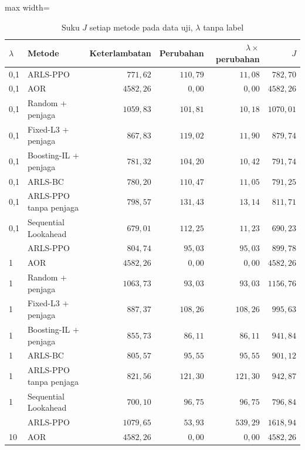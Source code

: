\begin{table}[htbp]
\caption{Suku $J$ setiap metode pada data uji, $\lambda$ tanpa label}
\label{tab:uji-uraian-tanpa-label}
\centering\footnotesize
\setlength{\tabcolsep}{4pt}
\begin{adjustbox}{max width=\textwidth}
\begin{tabular}{llrrrr}
\toprule
$\lambda$ & Metode & Keterlambatan & Perubahan & $\lambda\times$perubahan & $J$ \\
\midrule
0{,}1 & ARLS-PPO & $771{,}62$ & $110{,}79$ & $11{,}08$ & $782{,}70$ \\
0{,}1 & AOR & $4582{,}26$ & $0{,}00$ & $0{,}00$ & $4582{,}26$ \\
0{,}1 & Random + penjaga & $1059{,}83$ & $101{,}81$ & $10{,}18$ & $1070{,}01$ \\
0{,}1 & Fixed-L3 + penjaga & $867{,}83$ & $119{,}02$ & $11{,}90$ & $879{,}74$ \\
0{,}1 & Boosting-IL + penjaga & $781{,}32$ & $104{,}20$ & $10{,}42$ & $791{,}74$ \\
0{,}1 & ARLS-BC & $780{,}20$ & $110{,}47$ & $11{,}05$ & $791{,}25$ \\
0{,}1 & ARLS-PPO tanpa penjaga & $798{,}57$ & $131{,}43$ & $13{,}14$ & $811{,}71$ \\
0{,}1 & Sequential Lookahead & $679{,}01$ & $112{,}25$ & $11{,}23$ & $690{,}23$ \\
\addlinespace
1 & ARLS-PPO & $804{,}74$ & $95{,}03$ & $95{,}03$ & $899{,}78$ \\
1 & AOR & $4582{,}26$ & $0{,}00$ & $0{,}00$ & $4582{,}26$ \\
1 & Random + penjaga & $1063{,}73$ & $93{,}03$ & $93{,}03$ & $1156{,}76$ \\
1 & Fixed-L3 + penjaga & $887{,}37$ & $108{,}26$ & $108{,}26$ & $995{,}63$ \\
1 & Boosting-IL + penjaga & $855{,}73$ & $86{,}11$ & $86{,}11$ & $941{,}84$ \\
1 & ARLS-BC & $805{,}57$ & $95{,}55$ & $95{,}55$ & $901{,}12$ \\
1 & ARLS-PPO tanpa penjaga & $821{,}56$ & $121{,}30$ & $121{,}30$ & $942{,}87$ \\
1 & Sequential Lookahead & $700{,}10$ & $96{,}75$ & $96{,}75$ & $796{,}84$ \\
\addlinespace
10 & ARLS-PPO & $1079{,}65$ & $53{,}93$ & $539{,}29$ & $1618{,}94$ \\
10 & AOR & $4582{,}26$ & $0{,}00$ & $0{,}00$ & $4582{,}26$ \\

\end{tabular}
\end{adjustbox}
\end{table}
